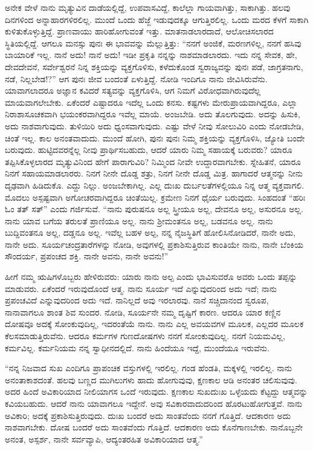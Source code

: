 ಅನೇಕ ವೇಳೆ ನಾನು ಮೃತ್ಯುವಿನ ದಾಡೆಯಲ್ಲಿದ್ದೆ, ಉಪವಾಸವಿದ್ದೆ, ಕಾಲೆಲ್ಲಾ ಗಾಯವಾಗಿತ್ತು, ಸಾಕಾಗಿತ್ತು. ಹಲವು ದಿನಗಳಿಂದ ಅನ್ನಾಹಾರಗಳಿರಲಿಲ್ಲ. ಮುಂದೆ ಒಂದು ಹೆಜ್ಜೆ ಇಡುವುದಕ್ಕೂ ಆಗುತ್ತಿರಲಿಲ್ಲ. ಒಂದು ಮರದ ಕೆಳಗೆ ಸಾಕಾಗಿ ಕುಳಿತುಕೊಳ್ಳುತ್ತಿದ್ದೆ. ಪ್ರಾಣವಾಯು ಹಾರಿಹೋಗುವಂತೆ ಇತ್ತು. ಮಾತನಾಡಲಾರದಾದೆ, ಆಲೋಚಿಸಲಾರದ ಸ್ಥಿತಿಯಲ್ಲಿದ್ದೆ. ಆಗಲೂ ಮನಸ್ಸು ಪುನಃ ಈ ಭಾವವನ್ನು ಮೆಲ್ಲುತ್ತಿತ್ತು: “ನನಗೆ ಅಂಜಿಕೆ, ಮರಣಗಳಿಲ್ಲ, ನನಗೆ ಹಸಿವು ಬಾಯಾರಿಕೆ ಇಲ್ಲ. ನಾನೆ ಅದು! ನಾನೆ ಅದು! ಇಡೀ ಪ್ರಕೃತಿ ನನ್ನನ್ನು ನಾಶಮಾಡಲಾರದು. ಇದು ನನ್ನ ಸೇವಕ, ಹೇ, ದೇವದೇವನೆ, ಸರ್ವೇಶ್ವರನೆ ನಿನ್ನ ಶಕ್ತಿಯನ್ನು ವ್ಯಕ್ತಗೊಳಿಸು, ಕಳೆದುಕೊಂಡ ಸ್ವರಾಜ್ಯವನ್ನು ಪುನಃ ಪಡೆ, ಜಾಗ್ರತನಾಗು, ನಡೆ, ನಿಲ್ಲಬೇಡ!?” ಆಗ ಪುನಃ ಜೀವ ಬಂದಂತೆ ಏಳುತ್ತಿದ್ದೆ. ನೋಡಿ ಇಂದಿಗೂ ನಾನು ಜೀವಿಸಿರುವೆನು. ಯಾವಾಗಲಾದರೂ ಅಜ್ಞಾನ ಕವಿದರೆ ಸತ್ಯವನ್ನು ವ್ಯಕ್ತಗೊಳಿಸಿ, ಆಗ ನಿಮಗೆ ವಿರೋಧವಾಗಿರುವುದೆಲ್ಲ ಮಾಯವಾಗಲೇಬೇಕು. ಏಕೆಂದರೆ ಎಷ್ಟಾದರೂ ಇದೆಲ್ಲ ಒಂದು ಕನಸು. ಕಷ್ಟಗಳು ಮೇರುಪ್ರಾಯವಾಗಿದ್ದರೂ, ಎಲ್ಲಾ ನಿರಾಶಾಸೂಚಕವಾಗಿ ಭಯಂಕರವಾಗಿದ್ದರೂ ಇವೆಲ್ಲ ಮಾಯೆ. ಅಂಜಬೇಡಿ. ಅದು ತೊಲಗುವುದು. ಅದನ್ನು ಹಿಸುಕಿ, ಅದು ನಾಶವಾಗುವುದು. ತುಳಿಯಿರಿ ಅದು ಧ್ವಂಸವಾಗುವುದು. ಎಷ್ಟು ವೇಳೆ ನೀವು ಸೋಲುವಿರಿ ಎಂದು ನೋಡಬೇಡಿ, ಚಿಂತೆ ಇಲ್ಲ. ಕಾಲ ಅನಂತವಾದುದು. ಮುಂದೆ ಹೋಗಿ, ಪುನಃ ಪುನಃ ನಿಮ್ಮ ಶಕ್ತಿಯನ್ನು ವ್ಯಕ್ತಗೊಳಿಸಿ, ಜ್ಯೋತಿ ಬಂದೇ ಬರುವುದು. ಹುಟ್ಟಿದವರನ್ನೆಲ್ಲ ನೀವು ಪ್ರಾರ್ಥಿಸಬಹುದು, ಆದರೆ ಯಾರು ನಿಮ್ಮ ಸಹಾಯಕ್ಕೆ ಬರುವರು? ಯಾರೂ ತಪ್ಪಿಸಿಕೊಳ್ಳಲಾರದ ಮೃತ್ಯುವಿನಿಂದ ಹೇಗೆ ಪಾರಾಗುವಿರಿ? ನಿಮ್ಮಿಂದ ನೀವೇ ಉದ್ದಾರವಾಗಬೇಕು. ಸ್ನೇಹಿತನೆ, ಯಾರೂ ನಿನಗೆ ಸಹಾಯಮಾಡಲಾರರು. ನಿನಗೆ ನೀನೇ ದೊಡ್ಡ ಶತ್ರು, ನಿನಗೆ ನೀನೇ ದೊಡ್ಡ ಮಿತ್ರ. ಹಾಗಾದರೆ ಆತ್ಮನನ್ನು ನೀನು ದೃಢವಾಗಿ ಹಿಡಿದುಕೊ. ಎದ್ದು ನಿಲ್ಲು. ಅಂಜಬೇಕಾಗಿಲ್ಲ. ಎಲ್ಲ ದುಃಖ ದುರ್ಬಲತೆಗಳಲ್ಲಿಯೂ ನಿನ್ನ ಆತ್ಮ ವ್ಯಕ್ತವಾಗಲಿ. ಮೊದಲು ಅಸ್ಪಷ್ಟವಾಗಿ ಅಗೋಚರವಾಗಿದ್ದರೂ ಚಿಂತೆಯಿಲ್ಲ. ಕ್ರಮೇಣ ನಿನಗೆ ಧೈರ್ಯ ಬರುವುದು. ಸಿಂಹದಂತೆ “ಹರಿಃ ಓಂ ತತ್ ಸತ್'' ಎಂದು ಗರ್ಜಿಸುವೆ. “ನಾನು ಪುರುಷನೂ ಅಲ್ಲ ಸ್ತ್ರೀಯೂ ಅಲ್ಲ, ದೇವನೂ ಅಲ್ಲ, ಅಸುರನೂ ಅಲ್ಲ. ನಾನು ಯಾವ ಬಗೆಯ ತರುಲತೆ ಪ್ರಾಣಿಯೂ ಅಲ್ಲ. ನಾನು ಶ‍್ರೀಮಂತನೂ ಅಲ್ಲ, ಬಡವನೂ ಅಲ್ಲ. ನಾನು ಬುದ್ದಿವಂತನೂ ಅಲ್ಲ, ದಡ್ಡನೂ ಅಲ್ಲ. ಇವೆಲ್ಲ ಬಹಳ ಅಲ್ಪ, ನನ್ನ ನೈಜಸ್ಥಿತಿಗೆ ಹೋಲಿಸಿ\break ನೋಡಿದರೆ, ನಾನೇ ಅದು, ನಾನೇ ಅದು. ಸೂರ್ಯಚಂದ್ರತಾರೆಗಳನ್ನು ನೋಡಿ, ಅವುಗಳಲ್ಲಿ ಪ್ರಕಾಶಿಸುತ್ತಿರುವ ಕಾಂತಿಯೇ ನಾನು, ನಾನೇ ಬೆಂಕಿಯ ಸೌಂದರ್ಯ, ಪ್ರಪಂಚದ ಶಕ್ತಿ. ನಾನೇ ಅವನು, ನಾನೇ ಅವನು!”

ಹೀಗೆ ನಮ್ಮ ಋಷಿಗಳೊಬ್ಬರು ಹೇಳಿರುವರು: ಯಾರು ನಾನು ಅಲ್ಪ ಎಂದು ಭಾವಿಸುವರೊ ಅವರು ಒಂದು ತಪ್ಪನ್ನು ಮಾಡುವರು. ಏಕೆಂದರೆ ಇರುವುದೊಂದೆ ಆತ್ಮ. ನಾನು ಸೂರ್ಯ ಇದೆ ಎನ್ನುವುದರಿಂದ ಅದು ಇದೆ; ನಾನು ಪ್ರಪಂಚವಿದೆ ಎನ್ನುವುದರಿಂದ ಅದು ಇದೆ. ನಾನಿಲ್ಲದೆ ಅವು ಇರಲಾರವು. ನಾನೆ ಸಚ್ಚಿದಾನಂದ ಸ್ವರೂಪ, ನಾನಾವಾಗಲೂ ಶಾಂತ ಶಿವ ಸುಂದರ. ನೋಡಿ, ಸೂರ್ಯನೇ ನಮ್ಮ ದೃಷ್ಟಿಗೆ ಕಾರಣ. ಆದರೂ ಯಾರ ಕಣ್ಣಿನ ದೋಷವೂ ಅದಕ್ಕೆ ಸೋಂಕುವುದಿಲ್ಲ, ಇದರಂತೆಯೆ ನಾನು. ನಾನು ಎಲ್ಲ ಅವಯವಗಳ ಮೂಲಕ, ಎಲ್ಲದರ ಮೂಲಕ ಕೆಲಸಮಾಡುತ್ತಿರುವೆನು. ಆದರೂ ಕರ್ಮಗಳ ಗುಣದೋಷಗಳು ನನಗೆ ಸೋಂಕುವುದಿಲ್ಲ. ನನಗೆ ನಿಯಮವಿಲ್ಲ, ಕರ್ಮವಿಲ್ಲ. ಕರ್ಮನಿಯಮ ನನ್ನ ಸ್ವಾಧೀನದಲ್ಲಿದೆ. ನಾನು ಹಿಂದೆಯೂ ಇದ್ದೆ, ಮುಂದೆಯೂ ಇರುವೆನು.

“ನನ್ನ ನಿಜವಾದ ಸುಖ ಎಂದಿಗೂ ಪ್ರಾಪಂಚಿಕ ವಸ್ತುಗಳಲ್ಲಿ ಇರಲಿಲ್ಲ. ಗಂಡ ಹೆಂಡತಿ, ಮಕ್ಕಳಲ್ಲಿ ಇರಲಿಲ್ಲ. ನಾನು ಅನಂತಾಕಾಶದಂತೆ. ಹಲವು ಬಣ್ಣದ ಮುಗಿಲುಗಳು ಹಾದು ಹೋಗುವುವು, ಕ್ಷಣಕಾಲ ಆಡಿ ಅನಂತರ ಚಲಿಸುವುವು. ಅದರ ಹಿಂದೆ ಅವಿಕಾರಿಯಾದ ನೀಲಿಯಾಗಸ ಒಂದೆ ಇರುವುದು. ಕ್ಷಣಕಾಲ ಸುಖದುಃಖ ಒಳ್ಳೆಯದು ಕೆಟ್ಟದ್ದು ಆತ್ಮವನ್ನು ಕವಿಯಬಹುದು. ಆದರೆ ನಾನು ಯಾವಾಗಲೂ ಇದ್ದೇನೆ. ಅವು ಸವಿಕಾರವಾದುದರಿಂದ ಹೊರಟುಹೋಗುತ್ತವೆ. ನಾನು ಅವಿಕಾರಿ; ಅದಕ್ಕೆ ಪ್ರಕಾಶಿಸುತ್ತಿರುವುದು. ದುಃಖ ಬಂದರೆ ಅದು ಸಾಂತವೆಂದು ನನಗೆ ಗೊತ್ತಿದೆ. ಆದಕಾರಣ ಅದು ನಾಶವಾಗಬೇಕು. ದೋಷ ಬಂದರೆ ಅದು ಸಾಂತವೆಂದು ಗೊತ್ತಿದೆ. ಆದಕಾರಣ ಅದು ಕೊನೆಗಾಣಬೇಕು. ನಾನೊಬ್ಬನೇ ಅನಂತ, ಅಸ್ಪರ್ಶ, ನಾನೇ ಸರ್ವವ್ಯಾಪಿ, ಆದ್ಯಂತರಹಿತ ಅವಿಕಾರಿಯಾದ ಆತ್ಮ.''

